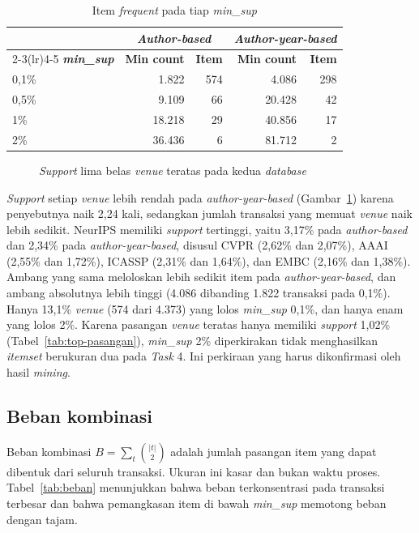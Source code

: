 \begin{table}[ht]
\caption{Item \textit{frequent} pada tiap \textit{min\_sup}}
\label{tab:item-frequent}
\small
\begin{tabular}{@{}lrrrr@{}}
\toprule
 & \multicolumn{2}{c}{\textbf{\textit{Author-based}}} & \multicolumn{2}{c}{\textbf{\textit{Author-year-based}}} \\
\cmidrule(lr){2-3}\cmidrule(lr){4-5}
\textbf{\textit{min\_sup}} & \textbf{Min count} & \textbf{Item} & \textbf{Min count} & \textbf{Item} \\
\midrule
0,1\% & 1.822 & 574 & 4.086 & 298 \\
0,5\% & 9.109 & 66 & 20.428 & 42 \\
1\% & 18.218 & 29 & 40.856 & 17 \\
2\% & 36.436 & 6 & 81.712 & 2 \\
\bottomrule
\end{tabular}
\end{table}

\begin{figure}[ht]
\centering
{}
\caption{\textit{Support} lima belas \textit{venue} teratas pada kedua \textit{database}}
\label{fig:support-item}
\end{figure}

\textit{Support} setiap \textit{venue} lebih rendah pada \textit{author-year-based} (Gambar~\ref{fig:support-item}) karena penyebutnya naik 2,24 kali, sedangkan jumlah transaksi yang memuat \textit{venue} naik lebih sedikit. NeurIPS memiliki \textit{support} tertinggi, yaitu 3,17\% pada \textit{author-based} dan 2,34\% pada \textit{author-year-based}, disusul CVPR (2,62\% dan 2,07\%), AAAI (2,55\% dan 1,72\%), ICASSP (2,31\% dan 1,64\%), dan EMBC (2,16\% dan 1,38\%). Ambang yang sama meloloskan lebih sedikit item pada \textit{author-year-based}, dan ambang absolutnya lebih tinggi (4.086 dibanding 1.822 transaksi pada 0,1\%). Hanya 13,1\% \textit{venue} (574 dari 4.373) yang lolos \textit{min\_sup} 0,1\%, dan hanya enam yang lolos 2\%. Karena pasangan \textit{venue} teratas hanya memiliki \textit{support} 1,02\% (Tabel~\ref{tab:top-pasangan}), \textit{min\_sup} 2\% diperkirakan tidak menghasilkan \textit{itemset} berukuran dua pada \textit{Task} 4. Ini perkiraan yang harus dikonfirmasi oleh hasil \textit{mining}.

\subsection{Beban kombinasi}
\label{sec:hasil-beban}
Beban kombinasi $B = \sum_{t} \binom{|t|}{2}$ adalah jumlah pasangan item yang dapat dibentuk dari seluruh transaksi. Ukuran ini kasar dan bukan waktu proses. Tabel~\ref{tab:beban} menunjukkan bahwa beban terkonsentrasi pada transaksi terbesar dan bahwa pemangkasan item di bawah \textit{min\_sup} memotong beban dengan tajam.

